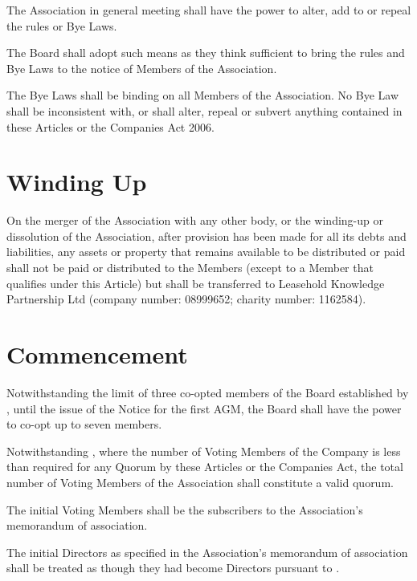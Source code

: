 \documentclass[10pt]{mk-articles-of-association}
\newcommand{\EC}[0]{Board}
\newcommand{\Exec}[0]{\EC{} }
\begin{document}
\begin{constenum}
\item The Association in general meeting shall have the power to
  alter, add to or repeal the rules or Bye Laws.

\item The \Exec shall adopt such means as they think sufficient to
  bring the rules and Bye Laws to the notice of Members of the Association.

\item The Bye Laws shall be binding on all Members of the
  Association. No Bye Law shall be inconsistent with, or shall
  alter, repeal or subvert anything contained in these Articles or
  the Companies Act 2006.
\end{constenum}



\section{Winding Up}

On the merger of the Association with any other body, or the
  winding-up or dissolution of the Association, after provision has
  been made for all its debts and liabilities, any assets or property
  that remains available to be distributed or paid shall not be paid
  or distributed to the Members (except to a Member that qualifies
  under this Article) but shall be transferred to Leasehold Knowledge
  Partnership Ltd (company number: 08999652; charity number: 1162584).



\section{Commencement}

\begin{constenum}
  \item Notwithstanding the limit of three co-opted members of the
    \Exec established by , until the issue of
    the Notice for the first AGM, the \Exec shall have the power to
    co-opt up to seven members.

  \item Notwithstanding , where the number of
    Voting Members of the Company is less than required for any Quorum
    by these Articles or the Companies Act, the total number of Voting
    Members of the Association shall constitute a valid quorum.

  \item The initial Voting Members shall
    be the subscribers to the Association’s memorandum of association.

  \item The initial Directors as specified in the Association’s
    memorandum of association shall be treated as though they had
    become Directors pursuant to .

\end{constenum}
\end{document}
